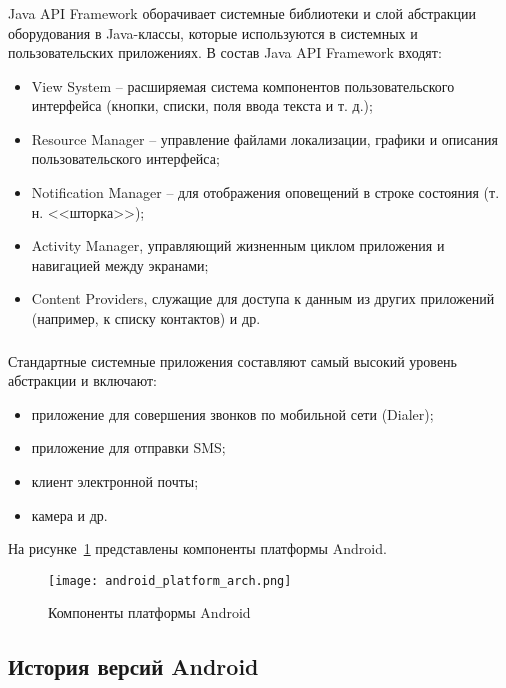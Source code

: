 \subsubsection{}
\label{subsub:android_platform:struct_and_arch:java_api}
Java API Framework оборачивает системные библиотеки и слой абстракции оборудования в Java-классы, которые используются в системных и пользовательских приложениях. В состав Java API Framework входят:
\begin{itemize}
	\item View System -- расширяемая система компонентов пользовательского интерфейса (кнопки, списки, поля ввода текста и т. д.);
	\item Resource Manager -- управление файлами локализации, графики и описания пользовательского интерфейса;
	\item Notification Manager -- для отображения оповещений в строке состояния (т. н. <<шторка>>);
	\item Activity Manager, управляющий жизненным циклом приложения и навигацией между экранами;
	\item Content Providers, служащие для доступа к данным из других приложений (например, к списку контактов) и др.
\end{itemize}

\subsubsection{}
\label{subsub:android_platform:struct_and_arch:system_apps}
Стандартные системные приложения составляют самый высокий уровень абстракции и включают:
\begin{itemize}
	\item приложение для совершения звонков по мобильной сети (Dialer);
	\item приложение для отправки SMS;
	\item клиент электронной почты;
	\item камера и др.
\end{itemize}

На рисунке~\ref{fig:android_platform_arch} представлены компоненты платформы Android.

\begin{figure}[p]
    \centering
    \texttt{[image: android\_platform\_arch.png]}  
    \caption{Компоненты платформы Android \cite{android_platform_arch}}
	\label{fig:android_platform_arch}
\end{figure}

\subsection{История версий Android}
\label{sub:android_platform:history}


